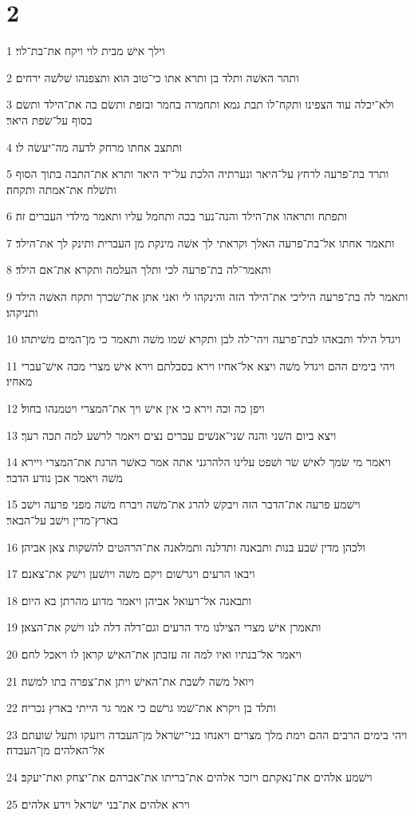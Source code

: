 \chapter{2}

\par 1 וילך אישׁ מבית לוי ויקח את־בת־לוי׃
\par 2 ותהר האשׁה ותלד בן ותרא אתו כי־טוב הוא ותצפנהו שׁלשׁה ירחים׃
\par 3 ולא־יכלה עוד הצפינו ותקח־לו תבת גמא ותחמרה בחמר ובזפת ותשׂם בה את־הילד ותשׂם בסוף על־שׂפת היאר׃
\par 4 ותתצב אחתו מרחק לדעה מה־יעשׂה לו׃
\par 5 ותרד בת־פרעה לרחץ על־היאר ונערתיה הלכת על־יד היאר ותרא את־התבה בתוך הסוף ותשׁלח את־אמתה ותקחה׃
\par 6 ותפתח ותראהו את־הילד והנה־נער בכה ותחמל עליו ותאמר מילדי העברים זה׃
\par 7 ותאמר אחתו אל־בת־פרעה האלך וקראתי לך אשׁה מינקת מן העברית ותינק לך את־הילד׃
\par 8 ותאמר־לה בת־פרעה לכי ותלך העלמה ותקרא את־אם הילד׃
\par 9 ותאמר לה בת־פרעה היליכי את־הילד הזה והינקהו לי ואני אתן את־שׂכרך ותקח האשׁה הילד ותניקהו׃
\par 10 ויגדל הילד ותבאהו לבת־פרעה ויהי־לה לבן ותקרא שׁמו משׁה ותאמר כי מן־המים משׁיתהו׃
\par 11 ויהי בימים ההם ויגדל משׁה ויצא אל־אחיו וירא בסבלתם וירא אישׁ מצרי מכה אישׁ־עברי מאחיו׃
\par 12 ויפן כה וכה וירא כי אין אישׁ ויך את־המצרי ויטמנהו בחול׃
\par 13 ויצא ביום השׁני והנה שׁני־אנשׁים עברים נצים ויאמר לרשׁע למה תכה רעך׃
\par 14 ויאמר מי שׂמך לאישׁ שׂר ושׁפט עלינו הלהרגני אתה אמר כאשׁר הרגת את־המצרי ויירא משׁה ויאמר אכן נודע הדבר׃
\par 15 וישׁמע פרעה את־הדבר הזה ויבקשׁ להרג את־משׁה ויברח משׁה מפני פרעה וישׁב בארץ־מדין וישׁב על־הבאר׃
\par 16 ולכהן מדין שׁבע בנות ותבאנה ותדלנה ותמלאנה את־הרהטים להשׁקות צאן אביהן׃
\par 17 ויבאו הרעים ויגרשׁום ויקם משׁה ויושׁען וישׁק את־צאנם׃
\par 18 ותבאנה אל־רעואל אביהן ויאמר מדוע מהרתן בא היום׃
\par 19 ותאמרן אישׁ מצרי הצילנו מיד הרעים וגם־דלה דלה לנו וישׁק את־הצאן׃
\par 20 ויאמר אל־בנתיו ואיו למה זה עזבתן את־האישׁ קראן לו ויאכל לחם׃
\par 21 ויואל משׁה לשׁבת את־האישׁ ויתן את־צפרה בתו למשׁה׃
\par 22 ותלד בן ויקרא את־שׁמו גרשׁם כי אמר גר הייתי בארץ נכריה׃
\par 23 ויהי בימים הרבים ההם וימת מלך מצרים ויאנחו בני־ישׂראל מן־העבדה ויזעקו ותעל שׁועתם אל־האלהים מן־העבדה׃
\par 24 וישׁמע אלהים את־נאקתם ויזכר אלהים את־בריתו את־אברהם את־יצחק ואת־יעקב׃
\par 25 וירא אלהים את־בני ישׂראל וידע אלהים׃

